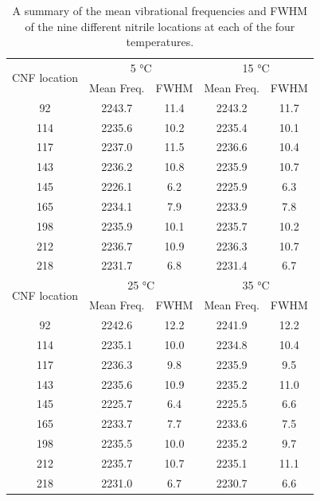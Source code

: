 \begin{table}
    \caption[Summary of experimental spectra]{A summary of the mean vibrational frequencies and FWHM of the nine different nitrile locations at each of the four temperatures.}
    \begin{center}
        \begin{tabular}{c|cc|cc}
            \toprule
            \multirow{2}{*}[-2pt]{CNF location} &   \multicolumn{2}{c}{5 \si{\celsius}}   &         \multicolumn{2}{c}{15 \si{\celsius}} \\
            \cmidrule[0.2pt](){2-5}
            
                 & Mean Freq.  & FWHM & Mean Freq. & FWHM\\ 
            \midrule
            92   & 2243.7  & 11.4 & 2243.2 & 11.7 \\
            114  & 2235.6  & 10.2 & 2235.4 & 10.1 \\
            117  & 2237.0  & 11.5 & 2236.6 & 10.4 \\
            143  & 2236.2  & 10.8 & 2235.9 & 10.7 \\
            145  & 2226.1  & 6.2  & 2225.9 & 6.3  \\
            165  & 2234.1  & 7.9  & 2233.9 & 7.8  \\
            198  & 2235.9  & 10.1 & 2235.7 & 10.2 \\
            212  & 2236.7  & 10.9 & 2236.3 & 10.7 \\
            218  & 2231.7  & 6.8  & 2231.4 & 6.7  \\

            \midrule   
            \multirow{2}{*}[-2pt]{CNF location} &   \multicolumn{2}{c}{25 \si{\celsius}}       &    \multicolumn{2}{c}{35 \si{\celsius}}    \\
            \cmidrule[0.2pt](){2-5}
             & Mean Freq. & FWHM &  Mean Freq. & FWHM \\
             \midrule

            92   & 2242.6 & 12.2 &  2241.9 & 12.2 \\
            114  & 2235.1 & 10.0 &  2234.8 & 10.4 \\
            117  & 2236.3 & 9.8  &  2235.9 & 9.5  \\
            143  & 2235.6 & 10.9 &  2235.2 & 11.0 \\
            145  & 2225.7 & 6.4  &  2225.5 & 6.6  \\
            165  & 2233.7 & 7.7  &  2233.6 & 7.5  \\
            198  & 2235.5 & 10.0 &  2235.2 & 9.7  \\
            212  & 2235.7 & 10.7 &  2235.1 & 11.1 \\
            218  & 2231.0 & 6.7  &  2230.7 & 6.6  \\





\end{tabular}
\end{center}
\end{table}
